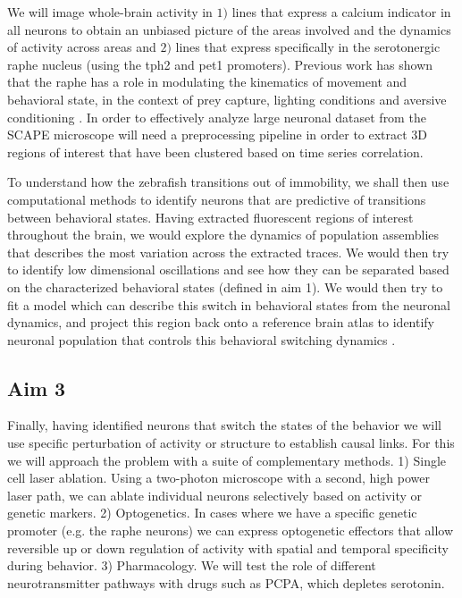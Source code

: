 \documentclass[]{article}
\begin{document}
We will image whole-brain activity in $1)$ lines that express a calcium indicator in all neurons to obtain an unbiased picture of the areas involved and the dynamics of activity across areas and $2)$ lines that express specifically in the serotonergic raphe nucleus (using the tph2 and pet1 promoters). Previous work has shown that the raphe has a role in modulating the kinematics of movement and behavioral state, in the context of prey capture, lighting conditions and aversive conditioning \cite{Andalman2019, Yokogawa2012, Marques2019}. In order to effectively analyze large neuronal dataset from the SCAPE microscope will need a preprocessing pipeline in order to extract 3D regions of interest that have been clustered based on time series correlation. 

To understand how the zebrafish transitions out of immobility, we shall then use computational methods to identify neurons that are predictive of transitions between behavioral states. Having extracted fluorescent regions of interest throughout the brain, we would explore the dynamics of population assemblies that describes the most variation across the extracted traces. We would then try to identify low dimensional oscillations and see how they can be separated based on the characterized behavioral states (defined in aim 1). We would then try to fit a model which can describe this switch in behavioral states from the neuronal dynamics, and project this region back onto a reference brain atlas to identify neuronal population that controls this behavioral switching dynamics \cite{Nichols2017, Ahamed2019, Bagi2022, Chen2018}.

\subsection{Aim 3}
Finally, having identified neurons that switch the states of the behavior we will use specific perturbation of activity or structure to establish causal links. For this we will approach the problem with a suite of complementary methods. 1) Single cell laser ablation. Using a two-photon microscope with a second, high power laser path, we can ablate individual neurons selectively based on activity or genetic markers. 2) Optogenetics. In cases where we have a specific genetic promoter (e.g. the raphe neurons) we can express optogenetic effectors that allow reversible up or down regulation of activity with spatial and temporal specificity during behavior. 3) Pharmacology. We will test the role of different neurotransmitter pathways with drugs such as PCPA, which depletes serotonin.
\end{document}
